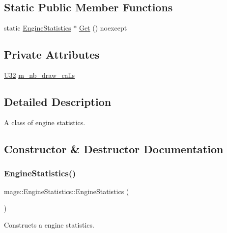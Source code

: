 \subsection*{Static Public Member Functions}
\begin{DoxyCompactItemize}
\item 
static \hyperlink{classmage_1_1_engine_statistics}{Engine\+Statistics} $\ast$ \hyperlink{classmage_1_1_engine_statistics_a7eb0d3a988676f71eea8e9f26ab07f42}{Get} () noexcept
\end{DoxyCompactItemize}
\subsection*{Private Attributes}
\begin{DoxyCompactItemize}
\item 
\hyperlink{namespacemage_a41c104c036fba3756a74e19f793eeaa1}{U32} \hyperlink{classmage_1_1_engine_statistics_a26eeba872cebff2657b8b023751b1894}{m\+\_\+nb\+\_\+draw\+\_\+calls}
\end{DoxyCompactItemize}


\subsection{Detailed Description}
A class of engine statistics. 

\subsection{Constructor \& Destructor Documentation}
\hypertarget{classmage_1_1_engine_statistics_acbaa39e0e0ee0d6cb5c8d174bb80a3fd}{}\label{classmage_1_1_engine_statistics_acbaa39e0e0ee0d6cb5c8d174bb80a3fd} 
\subsubsection{\texorpdfstring{Engine\+Statistics()}{EngineStatistics()}\hspace{0.1cm}{\footnotesize\ttfamily [1/3]}}
{\footnotesize\ttfamily mage\+::\+Engine\+Statistics\+::\+Engine\+Statistics (\begin{DoxyParamCaption}{ }\end{DoxyParamCaption})}

Constructs a engine statistics. \hypertarget{classmage_1_1_engine_statistics_a8361fa991298c7669b4e3c8262acff60}{}\label{classmage_1_1_engine_statistics_a8361fa991298c7669b4e3c8262acff60} 
